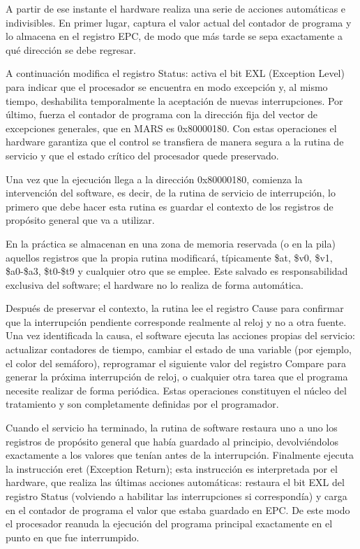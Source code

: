 \documentclass[12pt, letterpaper]{article}
\begin{document}
A partir de ese instante el hardware realiza una serie de acciones automáticas e indivisibles. En primer lugar, captura el valor actual del contador de programa y lo almacena en el registro EPC, de modo que más tarde se sepa exactamente a qué dirección se debe regresar. 

A continuación modifica el registro Status: activa el bit EXL (Exception Level) para indicar que el procesador se encuentra en modo excepción y, al mismo tiempo, deshabilita temporalmente la aceptación de nuevas interrupciones. Por último, fuerza el contador de programa con la dirección fija del vector de excepciones generales, que en MARS es 0x80000180. Con estas operaciones el hardware garantiza que el control se transfiera de manera segura a la rutina de servicio y que el estado crítico del procesador quede preservado.

Una vez que la ejecución llega a la dirección 0x80000180, comienza la intervención del software, es decir, de la rutina de servicio de interrupción, lo primero que debe hacer esta rutina es guardar el contexto de los registros de propósito general que va a utilizar.

En la práctica se almacenan en una zona de memoria reservada (o en la pila) aquellos registros que la propia rutina modificará, típicamente \$at, \$v0, \$v1, \$a0-\$a3, \$t0-\$t9 y cualquier otro que se emplee. Este salvado es responsabilidad exclusiva del software; el hardware no lo realiza de forma automática.

Después de preservar el contexto, la rutina lee el registro Cause para confirmar que la interrupción pendiente corresponde realmente al reloj y no a otra fuente. Una vez identificada la causa, el software ejecuta las acciones propias del servicio: actualizar contadores de tiempo, cambiar el estado de una variable (por ejemplo, el color del semáforo), reprogramar el siguiente valor del registro Compare para generar la próxima interrupción de reloj, o cualquier otra tarea que el programa necesite realizar de forma periódica. Estas operaciones constituyen el núcleo del tratamiento y son completamente definidas por el programador.

Cuando el servicio ha terminado, la rutina de software restaura uno a uno los registros de propósito general que había guardado al principio, devolviéndolos exactamente a los valores que tenían antes de la interrupción. Finalmente ejecuta la instrucción eret (Exception Return); esta instrucción es interpretada por el hardware, que realiza las últimas acciones automáticas: restaura el bit EXL del registro Status (volviendo a habilitar las interrupciones si correspondía) y carga en el contador de programa el valor que estaba guardado en EPC. De este modo el procesador reanuda la ejecución del programa principal exactamente en el punto en que fue interrumpido.
\end{document}
